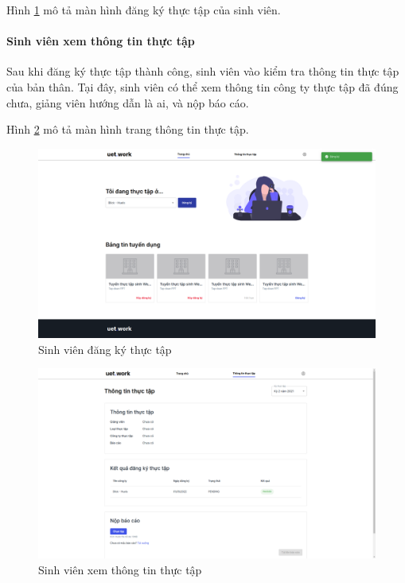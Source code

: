 \documentclass[./../main.tex]{subfiles}
\begin{document}
Hình \ref{fig:student_page} mô tả màn hình đăng ký thực tập của sinh viên.

\paragraph*{Sinh viên xem thông tin thực tập}
Sau khi đăng ký thực tập thành công, sinh viên vào kiểm tra thông tin thực tập của bản thân. Tại đây, sinh viên có thể xem thông tin công ty thực tập đã đúng chưa,  giảng viên hướng dẫn là ai, và nộp báo cáo.

Hình \ref{fig:view_internship_page} mô tả màn hình trang thông tin thực tập.

\begin{figure}[]
	\includegraphics[width=\linewidth]{./images/image15.png}
	\caption{Sinh viên đăng ký thực tập}
	\label{fig:student_page}
\end{figure}

\begin{figure}[]
	\includegraphics[width=\linewidth]{./images/image17.png}
	\caption{Sinh viên xem thông tin thực tập}
	\label{fig:view_internship_page}
\end{figure}
\end{document}
